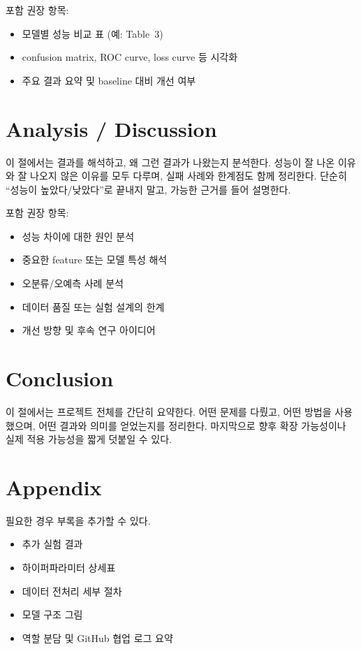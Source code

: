 \documentclass[10pt,a4paper,twocolumn]{article}
\begin{document}
포함 권장 항목:
\begin{itemize}
  \item 모델별 성능 비교 표 (예: Table~3)
  \item confusion matrix, ROC curve, loss curve 등 시각화
  \item 주요 결과 요약 및 baseline 대비 개선 여부
\end{itemize}

\section{Analysis / Discussion}

이 절에서는 결과를 해석하고, 왜 그런 결과가 나왔는지 분석한다. 성능이 잘 나온 이유와
잘 나오지 않은 이유를 모두 다루며, 실패 사례와 한계점도 함께 정리한다. 단순히
``성능이 높았다/낮았다''로 끝내지 말고, 가능한 근거를 들어 설명한다.

포함 권장 항목:
\begin{itemize}
  \item 성능 차이에 대한 원인 분석
  \item 중요한 feature 또는 모델 특성 해석
  \item 오분류/오예측 사례 분석
  \item 데이터 품질 또는 실험 설계의 한계
  \item 개선 방향 및 후속 연구 아이디어
\end{itemize}

\section{Conclusion}

이 절에서는 프로젝트 전체를 간단히 요약한다. 어떤 문제를 다뤘고, 어떤 방법을
사용했으며, 어떤 결과와 의미를 얻었는지를 정리한다. 마지막으로 향후 확장 가능성이나
실제 적용 가능성을 짧게 덧붙일 수 있다.




\appendix

\section*{Appendix}

필요한 경우 부록을 추가할 수 있다.

\begin{itemize}
  \item 추가 실험 결과
  \item 하이퍼파라미터 상세표
  \item 데이터 전처리 세부 절차
  \item 모델 구조 그림
  \item 역할 분담 및 GitHub 협업 로그 요약
\end{itemize}
\end{document}
